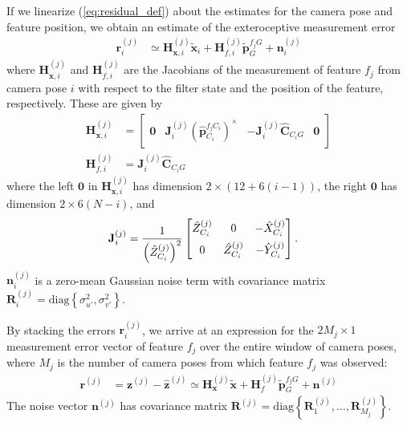 \documentclass[letterpaper, 10 pt, conference]{ieeeconf}  %
\def\Vec#1{\mathbf{#1}}
\newcommand{\bbm}{\begin{bmatrix}}
\newcommand{\ebm}{\end{bmatrix}}
\begin{document}
If we linearize (\ref{eq:residual_def}) about the estimates for the camera pose and feature position, we obtain an estimate of the exteroceptive measurement error
\begin{align}
    \Vec{r}_i^{(j)} &\simeq \Vec{H}_{\Vec{x}, i}^{(j)} \widetilde{\Vec{x}}_i + \Vec{H}_{f, i}^{(j)} \widetilde{\Vec{p}}_G^{f_j G} + \Vec{n}_i^{(j)}
\end{align}
where $\Vec{H}_{\Vec{x}, i}^{(j)}$ and $\Vec{H}_{f, i}^{(j)}$ are the Jacobians of the measurement of feature $f_j$ from camera pose $i$ with respect to the filter state and the position of the feature, respectively.
These are given by
\begin{align}
    \Vec{H}_{\Vec{x}, i}^{(j)} &= \bbm \Vec{0} & \Vec{J}^{\left(j\right)}_i \left(\hat{\Vec{p}}_{C_i}^{f_j C_i}\right)^\times & -\Vec{J}^{\left(j\right)}_i \hat{\Vec{C}}_{C_i G} & \Vec{0} \ebm \\
    \Vec{H}_{f, i}^{(j)} &= \Vec{J}^{\left(j\right)}_i \hat{\Vec{C}}_{C_i G}
\end{align}
where the left $\Vec{0}$ in $\Vec{H}_{\Vec{x}, i}^{(j)}$ has dimension $2\times\left(12+6\left(i-1\right)\right)$, the right $\Vec{0}$ has dimension $2\times6\left(N-i\right)$, and
\begin{align}
    \Vec{J}^{\left(j\right)}_i &= \frac{1}{\left(\hat{Z}^{(j)}_{C_i}\right)^2}
    \bbm \hat{Z}^{(j)}_{C_i} & 0 & -\hat{X}^{(j)}_{C_i} \vspace{0.5em} \\
             0 & \hat{Z}^{(j)}_{C_i} & -\hat{Y}^{(j)}_{C_i}
    \ebm .
\end{align}
$\Vec{n}_i^{(j)}$ is a zero-mean Gaussian noise term with covariance matrix $\Vec{R}_i^{(j)} = \text{diag}\left\{\sigma^2_{u'}, \sigma^2_{v'}\right\}$.

By stacking the errors $\Vec{r}_i^{(j)}$, we arrive at an expression for the $2M_j \times 1$ measurement error vector of feature $f_j$ over the entire window of camera poses, where $M_j$ is the number of camera poses from which feature $f_j$ was observed:
\begin{align} \label{eq:residual_stacked}
    \Vec{r}^{(j)} &= \Vec{z}^{(j)} - \hat{\Vec{z}}^{(j)} \simeq \Vec{H}_{\Vec{x}}^{(j)} \widetilde{\Vec{x}} + \Vec{H}_{f}^{(j)} \widetilde{\Vec{p}}_G^{f_j G} + \Vec{n}^{(j)}
\end{align}
The noise vector $\Vec{n}^{(j)}$ has covariance matrix $\Vec{R}^{(j)} = \text{diag}\left\{\Vec{R}_1^{(j)}, \hdots, \Vec{R}_{M_j}^{(j)}\right\}$.
\end{document}
